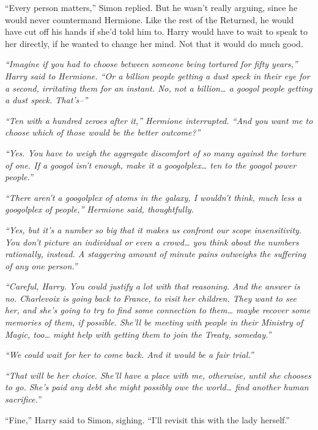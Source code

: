 ``Every person matters,'' Simon replied. But he wasn't really arguing,
since he would never countermand Hermione. Like the rest of the
Returned, he would have cut off his hands if she'd told him to. Harry
would have to wait to speak to her directly, if he wanted to change her
mind. Not that it would do much good.

\mybreak

\emph{``Imagine if you had to choose between someone being tortured for
fifty years,'' Harry said to Hermione. ``Or a billion people getting a
dust speck in their eye for a second, irritating them for an instant.
No, not a billion\ldots{} a googol people getting a dust speck.
That's--''}

\emph{``Ten with a hundred zeroes after it,'' Hermione interrupted.
``And you want me to choose which of those would be the better
outcome?''}

\emph{``Yes. You have to weigh the aggregate discomfort of so many
against the torture of one. If a googol isn't enough, make it a
googolplex\ldots{} ten to the googol power people.''}

\emph{``There aren't a googolplex of atoms in the galaxy, I wouldn't
think, much less a googolplex of people,'' Hermione said, thoughtfully.}

\emph{``Yes, but it's a number so big that it makes us confront our
scope insensitivity. You don't picture an individual or even a
crowd\ldots{} you think about the numbers rationally, instead. A
staggering amount of minute pains outweighs the suffering of any one
person.''}

\emph{``Careful, Harry. You could justify a lot with that reasoning. And
the answer is no. Charlevoix is going back to France, to visit her
children. They want to see her, and she's going to try to find some
connection to them\ldots{} maybe recover some memories of them, if
possible. She'll be meeting with people in their Ministry of Magic,
too\ldots{} might help with getting them to join the Treaty, someday.''}

\emph{``We could wait for her to come back. And it would be a fair
trial.''}

\emph{``That will be her choice. She'll have a place with me, otherwise,
until she chooses to go. She's paid any debt she might possibly owe the
world\ldots{} find another human sacrifice.''}

\mybreak

``Fine,'' Harry said to Simon, sighing. ``I'll revisit this with the
lady herself.''

